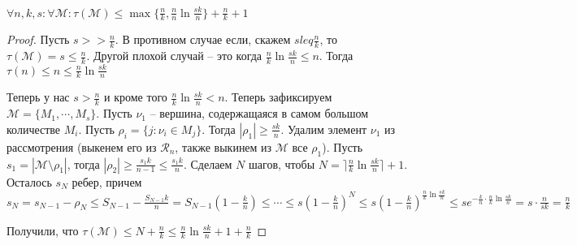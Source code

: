 \documentclass[document.tex]{subfiles}
\begin{document}
\begin{theorem}[Эрдеш]
    $\forall n, k, s: \forall \mathcal{M}: \tau(\mathcal{M}) \leq \max \{\frac{n}{k}, \frac{n}{n} \ln \frac{sk}{n}\} +
    \frac{n}{k} + 1$
\end{theorem}

\begin{proof}
    Пусть $s >> \frac{n}{k}$. В противном случае если, скажем $s leq \frac{n}{k}$, то $\tau(\mathcal{M}) = s \leq
    \frac{n}{k}$. Другой плохой случай -- это когда $\frac{n}{k} \ln \frac{sk}{n} \leq n$. Тогда $\tau(n) \leq n \leq
    \frac{n}{k} \ln \frac{sk}{n}$ 

    Теперь у нас $s > \frac{n}{k}$ и кроме того $\frac{n}{k} \ln \frac{sk}{n} < n$. Теперь зафиксируем
    $\mathcal{M} = \{M_1, \cdots, M_s\}$. Пусть $\nu_1$ -- вершина, содержащаяся в самом большом количестве $M_i$. Пусть
    $\rho_i = \{j : \nu_i \in M_j\}$. Тогда $|\rho_1| \geq \frac{sk}{n}$. Удалим элемент $\nu_1$ из рассмотрения (выкенем
    его из $\mathcal{R}_n$, также выкинем из $\mathcal{M}$ все $\rho_1$). Пусть $s_1 = |\mathcal{M} \setminus
    \rho_1|$, тогда $|\rho_2| \geq \frac{s_1k}{n - 1} \leq \frac{s_1 k}{n}$. Сделаем $N$ шагов, чтобы $N = \rceil
    \frac{n}{k} \ln \frac{sk}{n} \rceil + 1$. Осталось $s_N$ ребер, причем $s_N = s_{N - 1} - \rho_N \leq
    S_{N - 1} - \frac{S_{N - 1}k}{n} = S_{N - 1}(1 - \frac{k}{n}) \leq \cdots \leq s(1 - \frac{k}{n})^N \leq s (1 -
    \frac{k}{n})^{\frac{n}{k} \ln \frac{sk}{n}} \leq s e^{-\frac{k}{n} \cdot \frac{n}{k} \ln \frac{sk}{n}} = s \cdot
    \frac{n}{sk} = \frac{n}{k}$

    Получили, что $\tau(\mathcal{M}) \leq N + \frac{n}{k} \leq \frac{n}{k} \ln \frac{sk}{n} + 1 + \frac{n}{k}$
\end{proof}
\end{document}
